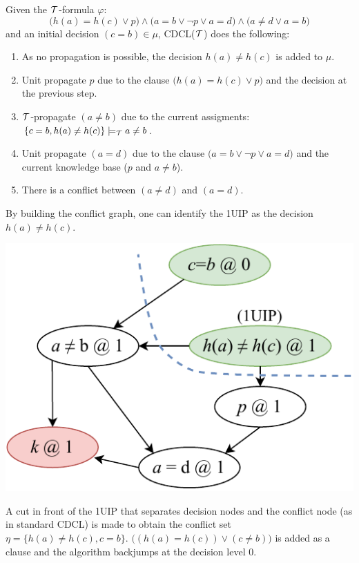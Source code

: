 \begin{example}
    Given the $\mathcal{T}$-formula $\varphi$:
    \[ \big( h(a) = h(c) \vee p \big) \land \big( a = b \vee \lnot p \vee a = d \big) \land \big( a \neq d \vee a = b \big) \]
    and an initial decision $(c = b) \in \mu$,
    CDCL($\mathcal{T}$) does the following:
    \begin{enumerate}
        \item As no propagation is possible, the decision $h(a) \neq h(c)$ is added to $\mu$.
        \item Unit propagate $p$ due to the clause $\big( h(a) = h(c) \vee p \big)$ and the decision at the previous step.
        \item $\mathcal{T}$-propagate $(a \neq b)$ due to the current assigments: $\{ c = b, h(a) \neq h(c) \} \models_{\mathcal{T}} a \neq b$.
        \item Unit propagate $(a = d)$ due to the clause $\big( a = b \vee \lnot p \vee a = d \big)$ and the current knowledge base ($p$ and $a \neq b$).
        \item There is a conflict between $(a \neq d)$ and $(a = d)$.
    \end{enumerate}

    By building the conflict graph, one can identify the 1UIP as the decision $h(a) \neq h(c)$.
    \begin{center}
        \includegraphics[width=0.35\linewidth]{./img/_conflict_graph_example.pdf}
    \end{center}
    A cut in front of the 1UIP that separates decision nodes and the conflict node (as in standard CDCL) is made
    to obtain the conflict set $\eta = \{ h(a) \neq h(c), c = b \}$.
    $\big( (h(a) = h(c)) \vee (c \neq b) \big)$ is added as a clause and the algorithm backjumps at the decision level 0.
\end{example}

